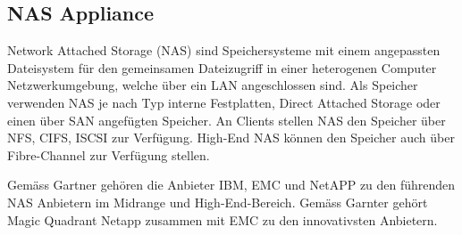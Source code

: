 \subsection{NAS Appliance}

Network Attached Storage (NAS) sind Speichersysteme mit einem angepassten Dateisystem für den gemeinsamen Dateizugriff in einer heterogenen Computer Netzwerkumgebung, welche über ein LAN angeschlossen sind. Als Speicher verwenden NAS je nach Typ interne Festplatten, Direct Attached Storage oder einen über SAN angefügten Speicher.
An Clients stellen NAS den Speicher über NFS, CIFS, ISCSI zur Verfügung. High-End NAS können den Speicher auch über Fibre-Channel zur Verfügung stellen.

Gemäss Gartner gehören die Anbieter \gls{IBM,} \gls{EMC} und \gls{NetAPP} zu den führenden NAS Anbietern im Midrange und High-End-Bereich. Gemäss Garnter gehört Magic Quadrant Netapp zusammen mit EMC zu den innovativsten Anbietern.


